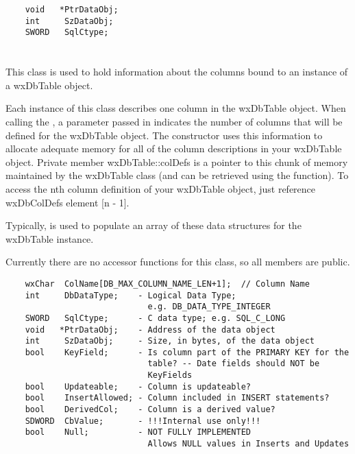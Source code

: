 \begin{verbatim}
    void   *PtrDataObj;
    int     SzDataObj;
    SWORD   SqlCtype;
\end{verbatim}


\section{}\label{wxdbcoldef}

This class is used to hold information about the columns bound to an 
instance of a wxDbTable object.  

Each instance of this class describes one column in the wxDbTable 
object.  When calling the , a 
parameter passed in indicates the number of columns that will be defined for 
the wxDbTable object.  The constructor uses this information to allocate 
adequate memory for all of the column descriptions in your wxDbTable object.  
Private member wxDbTable::colDefs is a pointer to this chunk of memory 
maintained by the wxDbTable class (and can be retrieved using the 
 function).  
To access the nth column definition of your wxDbTable object, just reference 
wxDbColDefs element [n - 1].

Typically,  is used to 
populate an array of these data structures for the wxDbTable instance.

Currently there are no accessor functions for this class, so all members are 
public.

\begin{verbatim}
    wxChar  ColName[DB_MAX_COLUMN_NAME_LEN+1];  // Column Name
    int     DbDataType;    - Logical Data Type; 
                             e.g. DB_DATA_TYPE_INTEGER
    SWORD   SqlCtype;      - C data type; e.g. SQL_C_LONG
    void   *PtrDataObj;    - Address of the data object
    int     SzDataObj;     - Size, in bytes, of the data object
    bool    KeyField;      - Is column part of the PRIMARY KEY for the
                             table? -- Date fields should NOT be 
                             KeyFields
    bool    Updateable;    - Column is updateable?
    bool    InsertAllowed; - Column included in INSERT statements?
    bool    DerivedCol;    - Column is a derived value?
    SDWORD  CbValue;       - !!!Internal use only!!!
    bool    Null;          - NOT FULLY IMPLEMENTED
                             Allows NULL values in Inserts and Updates
\end{verbatim}

